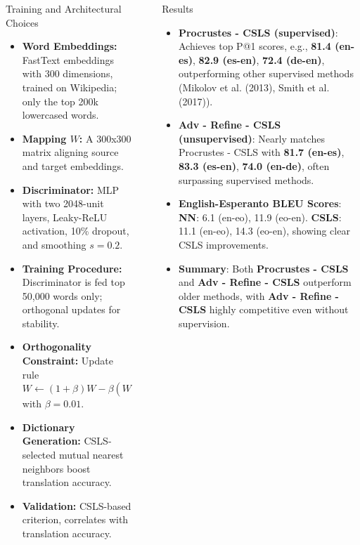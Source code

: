 \documentclass[final]{beamer}
\newlength{\sepwid}
\newlength{\onecolwid}
\newlength{\twocolwid}
\newcommand{\normalsizecaption}{\captionsetup[table]{font=small}}
\begin{document}
\begin{frame}[t]
\begin{columns}[t]
\begin{column}{\twocolwid}
\begin{block}{Training and Architectural Choices}
\begin{itemize}
    \item \textbf{Word Embeddings:} FastText embeddings with 300 dimensions, trained on Wikipedia; only the top 200k lowercased words.
    \item \textbf{Mapping \( W \):} A 300x300 matrix aligning source and target embeddings.
    \item \textbf{Discriminator:} MLP with two 2048-unit layers, Leaky-ReLU activation, 10\% dropout, and smoothing \( s = 0.2 \).
    \item \textbf{Training Procedure:} Discriminator is fed top 50,000 words only; orthogonal updates for stability.
    \item \textbf{Orthogonality Constraint:} Update rule \( W \leftarrow (1 + \beta)W - \beta(WW^{T})W \) with \( \beta = 0.01 \).
    \item \textbf{Dictionary Generation:} CSLS-selected mutual nearest neighbors boost translation accuracy.
    \item \textbf{Validation:} CSLS-based criterion, correlates with translation accuracy.
\end{itemize}
\end{block}


\end{column} 

\begin{column}{\sepwid}\end{column} 
\begin{column}{\onecolwid} 

\begin{block}{Results}
\begin{itemize}
    \item \textbf{Procrustes - CSLS (supervised)}: Achieves top P@1 scores, e.g., \textbf{81.4 (en-es)}, \textbf{82.9 (es-en)}, \textbf{72.4 (de-en)}, outperforming other supervised methods (Mikolov et al. (2013), Smith et al. (2017)).
    \item \textbf{Adv - Refine - CSLS (unsupervised)}: Nearly matches Procrustes - CSLS with \textbf{81.7 (en-es)}, \textbf{83.3 (es-en)}, \textbf{74.0 (en-de)}, often surpassing supervised methods.
    \item \textbf{English-Esperanto BLEU Scores}: \textbf{NN}: 6.1 (en-eo), 11.9 (eo-en). \textbf{CSLS}: 11.1 (en-eo), 14.3 (eo-en), showing clear CSLS improvements.
    \item \textbf{Summary}: Both \textbf{Procrustes - CSLS} and \textbf{Adv - Refine - CSLS} outperform older methods, with \textbf{Adv - Refine - CSLS} highly competitive even without supervision.
\end{itemize}
\vspace{-1cm}
\normalsizecaption
\begin{table}[ht]
\centering
\setlength{\tabcolsep}{4pt}  %
\renewcommand{\arraystretch}{0.9}
\resizebox{\columnwidth}{!}{ %

}
\end{table}
\end{block}
\end{column}
\end{columns}
\end{frame}
\end{document}
